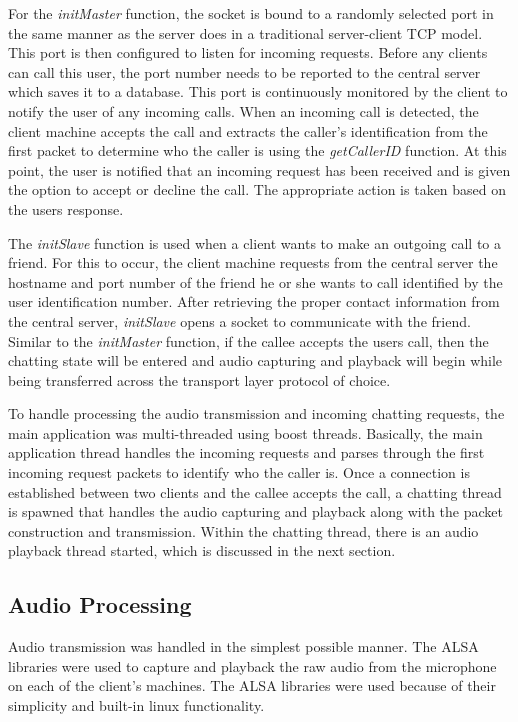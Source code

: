 \documentclass[letterpaper, 9 pt, balance, conference]{ieeeconf}
\begin{document}
For the \textit{initMaster} function, the socket is bound to a randomly selected 
port in the same manner as the server does in a traditional server-client TCP model.
This port is then configured to listen for incoming requests. 
Before any clients can call this user, the port number needs to be reported to
the central server which saves it to a database. This port is continuously 
monitored by the client to notify the user of any incoming calls.  When an incoming
call is detected, the client machine accepts the call and extracts the caller's 
identification from the first packet to determine who the caller is using the 
\textit{getCallerID} function.  At this point, the user is notified that an 
incoming request has been received and is given the option to accept or decline
the call.  The appropriate action is taken based on the users response.

The \textit{initSlave} function is used when a client wants to make an outgoing
call to a friend.  For this to occur, the client machine requests from the central 
server the hostname and port number of the friend he or she wants to call 
identified by the user identification number.  After retrieving the proper contact 
information from the central server, \textit{initSlave} opens a socket to 
communicate with the friend.  Similar to the \textit{initMaster} function, if the
callee accepts the users call, then the chatting state will be entered and audio
capturing and playback will begin while being transferred across the transport
layer protocol of choice.

To handle processing the audio transmission and incoming chatting requests, the
main application was multi-threaded using boost threads.  Basically, the main
application thread handles the incoming requests and parses through the first
incoming request packets to identify who the caller is.  Once a connection
is established between two clients and the callee accepts the call, a chatting
thread is spawned that handles the audio capturing and playback along with the 
packet construction and transmission.  Within the chatting thread, there is an
audio playback thread started, which is discussed in the next section.



\subsection{Audio Processing}
\label{subsec:audio_proc}

Audio transmission was handled in the simplest possible manner.  The ALSA libraries
were used to capture and playback the raw audio from the microphone on each of the 
client's machines.  The ALSA libraries were used because of their simplicity and
built-in linux functionality.   
\end{document}
